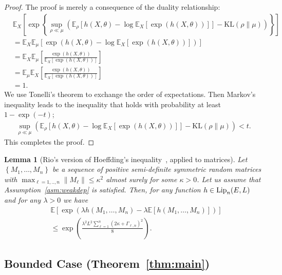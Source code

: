 \documentclass[11pt,a4paper]{article}
\newtheorem{lemma}[theorem]{Lemma}
\theoremstyle{remark}
\theoremstyle{definition}
\theoremstyle{definition}
\newcommand{\Ep}{\mathbb{E}}
\begin{document}
\begin{bibunit}[apalike]
\begin{proof}
The proof is merely a consequence of the duality relationship:
\begin{align*}
    &\Ep_{X}\left[\exp \left\{\sup_{\rho\ll\mu}\left(\Ep_{\rho}\left[h\left(X,\theta\right)-\log\Ep_{X}[\exp (h\left(X,\theta\right))]\right]-\mathrm{KL}\left(\rho \| \mu\right)\right) \right\} \right]\\
    &=\Ep_{X}\Ep_{\mu} \left[\exp\left(h\left(X,\theta\right)-\log\Ep_{X}[\exp (h\left(X,\theta\right))]\right) \right]\\
    &=\Ep_{X}\Ep_{\mu}\left[\frac{\exp ( h\left(X,\theta\right))}{\Ep_{X}[\exp (h\left(X,\theta\right))]}\right]\\
    &=\Ep_{\mu}\Ep_{X}\left[\frac{\exp ( h\left(X,\theta\right))}{\Ep_{X}[\exp (h\left(X,\theta\right))]}\right]\\
    &=1.
\end{align*}
We use Tonelli's theorem to exchange the order of expectations.
Then Markov's inequality leads to the inequality that holds with probability at least $1-\exp(-t)$;
\begin{align*}
    \sup_{\rho\ll\mu}\left(\Ep_{\rho}\left[h\left(X,\theta\right)-\log\Ep_{X}[\exp (h\left(X,\theta\right))]\right]-\mathrm{KL}\left(\rho \|\mu\right)\right)<t.
\end{align*}
This completes the proof.
\end{proof}


\begin{lemma}[Rio's version of Hoeffding's inequality~\citep{rio2000inegalites}, applied to matrices]
\label{lemma:rio}
Let $\left\{M_{1},\ldots,M_{n}\right\}$ be a sequence of positive semi-definite symmetric random matrices with $ \max_{\ell = 1,..,n}\left\|M_{\ell}\right\|\le \kappa^{2}$ almost surely for some $\kappa>0$. %
Let us assume that Assumption~\ref{asm:weakdep} is satisfied. Then, for any function $h\in {\rm Lip}_{n}(E,L) $ and for any $\lambda>0$ we have
\begin{align*}
&\mathbb{E} \left[ \exp\left( \lambda h(M_1,\dots,M_n)- \lambda \mathbb{E}[h(M_1,\dots,M_n)] \right) \right]
\\
&\leq \exp\left(\frac{\lambda^2 L^2 \sum_{\ell=1}^n \left( 2\kappa + \Gamma_{\ell,n} \right)^2 }{8}\right).    
\end{align*}
\end{lemma}

\subsection{Bounded Case (Theorem~\ref{thm:main})}
\label{subsub:proof:main}



\end{bibunit}
\end{document}
